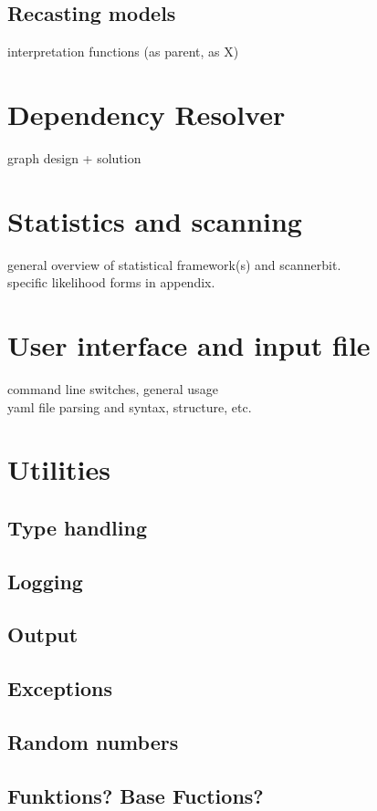 \documentclass[11pt,a4paper]{article}
\begin{document}
\subsection{Recasting models}
interpretation functions (as parent, as X)\\

\section{Dependency Resolver}
graph design + solution

\section{Statistics and scanning}
general overview of statistical framework(s) and scannerbit.\\
specific likelihood forms in appendix.

\section{User interface and input file}
command line switches, general usage\\
yaml file parsing and syntax, structure, etc.

\section{Utilities}
\subsection{Type handling}
\subsection{Logging}
\subsection{Output}
\subsection{Exceptions}
\subsection{Random numbers}
\subsection{Funktions? Base Fuctions?}
\end{document}
